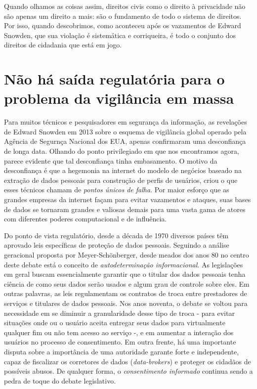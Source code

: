Quando olhamos as coisas assim, direitos civis como o direito à
privacidade não são apenas um direito a mais: são o fundamento de todo o
sistema de direitos. Por isso, quando descobrimos, como aconteceu após
os vazamentos de Edward Snowden, que sua violação é sistemática e
corriqueira, é todo o conjunto dos direitos de cidadania que está em
jogo.

\section{Não há saída regulatória para o problema da vigilância em massa}

Para muitos técnicos e pesquisadores em segurança da informação, as
revelações de Edward Snowden em 2013 sobre o esquema de vigilância
global operado pela Agência de Segurnça Nacional dos EUA, apenas
confirmaram uma desconfiança de longa data. Olhando do ponto
privilegiado em que nos encontramos agora, parece evidente que tal
desconfiança tinha embasamento. O motivo da desconfiança é que a
hegemonia na internet do modelo de negócios baseado na extração de dados
pessoais para construção de perfis de usuários, criou o que esses
técnicos chamam de \emph{pontos únicos de falha}. Por maior esforço que
as grandes empresas da internet façam para evitar vazamentos e ataques,
suas bases de dados se tornaram grandes e valiosas demais para uma vasta
gama de atores com diferentes poderes computacional e de influência.

Do ponto de vista regulatório, desde a década de 1970 diversos países
têm aprovado leis específicas de proteção de dados pessoais. Seguindo a
análise geracional proposta por Meyer-Schönberger, desde meados dos anos
80 no centro deste debate está o conceito de \emph{autodeterminação
informacional}. As legislações em geral buscam essencialmente garantir
que o titular dos dados pessoais tenha ciência de como seus dados serão
usados e algum grau de controle sobre eles. Em outras palavras, as leis
regulamentam os contratos de troca entre prestadores de serviços e
titulares de dados pessoais. Nos anos noventa, o debate se voltou para
necessidade em se diminuir a granularidade desse tipo de troca - para
evitar situações onde ou o usuário aceita entregar seus dados para
virtualmente qualquer fim ou não tem acesso ao serviço -, e em aumentar
a interação dos usuários no processo de consentimento. Em outra frente,
há uma importante disputa sobre a importância de uma autoridade garante
forte e independente, capaz de fiscalizar os corretores de dados
(\emph{data-brokers}) e proteger os cidadãos de possíveis abusos. De
qualquer forma, o \emph{consentimento informado} continua sendo a pedra
de toque do debate legislativo.

